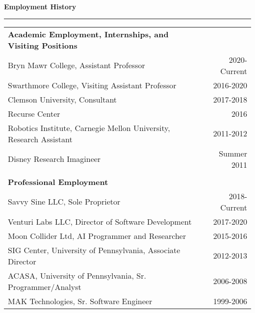 \needspace{6em}
{\Large {\bf Employment History}} 
\vspace{0.1cm}
\hrule
\medskip

\begin{tabular*}{7.1in}{@{}l@{\extracolsep\fill}r}
{\bf Academic Employment, Internships, and Visiting Positions} \\
Bryn Mawr College, Assistant Professor & 2020-Current\\
Swarthmore College, Visiting Assistant Professor & 2016-2020\\
Clemson University, Consultant & 2017-2018\\
Recurse Center & 2016\\
Robotics Institute, Carnegie Mellon University, Research Assistant & 2011-2012\\
Disney Research Imagineer & Summer 2011\\
\phantom{yommomma} & \phantom{2002}\\
{\bf Professional Employment} \\
Savvy Sine LLC, Sole Proprietor & 2018-Current\\ 
Venturi Labs LLC, Director of Software Development & 2017-2020\\
Moon Collider Ltd, AI Programmer and Researcher & 2015-2016\\
SIG Center, University of Pennsylvania, Associate Director & 2012-2013\\
ACASA, University of Pennsylvania, Sr. Programmer/Analyst & 2006-2008\\
MAK Technologies, Sr. Software Engineer & 1999-2006\\
\end{tabular*}




